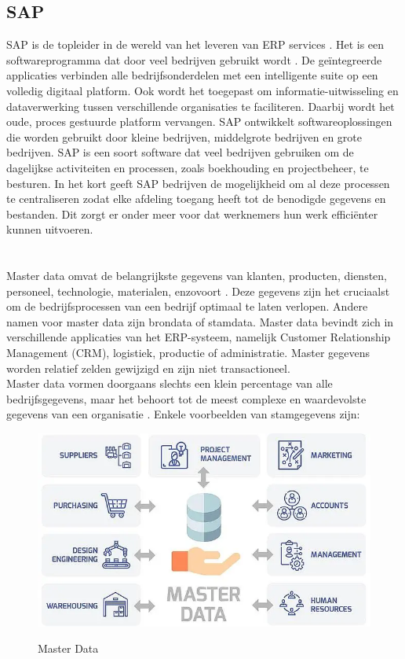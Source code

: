 \subsection{SAP}
SAP is de topleider in de wereld van het leveren van ERP services \autocite{WatSAP}. Het is een softwareprogramma dat door veel bedrijven gebruikt wordt \autocite{Indeed2023}. De geïntegreerde applicaties verbinden alle bedrijfsonderdelen met een intelligente suite op een volledig digitaal platform. Ook wordt het toegepast om informatie-uitwisseling en dataverwerking tussen verschillende organisaties te faciliteren. Daarbij wordt het oude, proces gestuurde platform vervangen. SAP ontwikkelt softwareoplossingen die worden gebruikt door kleine bedrijven, middelgrote bedrijven en grote bedrijven.
SAP is een soort software dat veel bedrijven gebruiken om de dagelijkse activiteiten en processen, zoals boekhouding en projectbeheer, te besturen. In het kort geeft SAP bedrijven de mogelijkheid om al deze processen te centraliseren zodat elke afdeling toegang heeft tot de benodigde gegevens en bestanden. Dit zorgt er onder meer voor dat werknemers hun werk efficiënter kunnen uitvoeren.

\section{}%
\label{sec:masterdata}
Master data omvat de belangrijkste gegevens van klanten, producten, diensten, personeel, technologie, materialen, enzovoort \autocite{Prokhorov2018}. Deze gegevens zijn het cruciaalst om de bedrijfsprocessen van een bedrijf optimaal te laten verlopen. Andere namen voor master data zijn brondata of stamdata. Master data bevindt zich in verschillende applicaties van het ERP-systeem, namelijk Customer Relationship Management (CRM), logistiek, productie of administratie. Master gegevens worden relatief zelden gewijzigd en zijn niet transactioneel.
\\ Master data vormen doorgaans slechts een klein percentage van alle bedrijfsgegevens, maar het behoort tot de meest complexe en waardevolste gegevens van een organisatie \autocite{SAPMasterData}. 
Enkele voorbeelden van stamgegevens zijn: 

\begin{figure}[htbp]
  \centering
  \includegraphics[scale=0.4]{../images/Master-Data.png}
  \caption{Master Data}
  \parbox{\textwidth}{\autocite{Roddewig2022}}
\end{figure}

